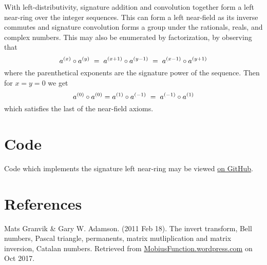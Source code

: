 \documentclass{article}
\begin{document}
\noindent With left-distributivity, signature addition and convolution together form a left near-ring over the integer sequences. This can form a left near-field as its inverse commutes and signature convolution forms a group under the rationals, reals, and complex numbers. This may also be enumerated by factorization, by observing that \begin{equation}a^{(x)} \circ a^{(y)} \hspace{1mm} = \hspace{1mm} a^{(x+1)} \circ a^{(y-1)} \hspace{1mm} = \hspace{1mm} a^{(x-1)} \circ a^{(y+1)}\end{equation} where the parenthetical exponents are the signature power of the sequence. Then for $x = y = 0$ we get \begin{equation} a^{(0)} \circ a^{(0)} = a^{(1)} \circ a^{(-1)} \hspace{1mm} = \hspace{1mm} a^{(-1)} \circ a^{(1)}\end{equation} which satisfies the last of the near-field axioms.

\iffalse
\subsection{Aerated signature convolution}

\noindent We can combine the process of signature convolution with signature aeration for the following identity:

\begin{equation} \sum_{k=0}^{n} d_{k}^{n-ak} \cdot F_g(n-ak) = F_{{\displaystyle \sum_{k=0}^{\infty} A_{d^{k+1}}^a} x^k g_k}(n) \end{equation}
\fi

\section{Code}

Code which implements the signature left near-ring may be viewed \href{https://github.com/cxr00/cxr/blob/master/cxr/math/snr.py}{on GitHub}.

\pagebreak
\section{References}

\noindent Mats Granvik \& Gary W. Adamson. (2011 Feb 18).  The invert transform, Bell numbers, Pascal triangle, permanents, matrix mutliplication and matrix inversion, Catalan numbers. Retrieved from \href{https://mobiusfunction.wordpress.com/2011/02/18/the-invert-transform-bell-numbers-pascal-triangle-permanents-matrix-multiplication-and-matrix-inversion-catalan-numbers/}{MobiusFunction.wordpress.com} on Oct 2017.\\
\end{document}
